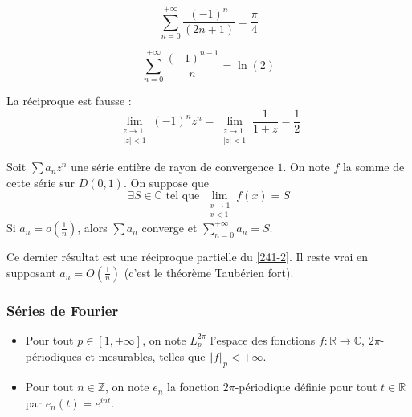 	\begin{application}
		\[ \sum_{n=0}^{+\infty} \frac{(-1)^n}{(2n+1)} = \frac{\pi}{4} \]
	\end{application}
	
	\begin{application}
		\[ \sum_{n=0}^{+\infty} \frac{(-1)^{n-1}}{n} = \ln(2) \]
	\end{application}
	
	\begin{cexample}
		La réciproque est fausse :
		\[ \lim_{\substack{z \rightarrow 1 \\ \vert z \vert < 1}} (-1)^n z^n = \lim_{\substack{z \rightarrow 1 \\ \vert z \vert < 1}} \frac{1}{1+z} = \frac{1}{2} \]
	\end{cexample}
	
	\begin{theorem}
		Soit $\sum a_n z^n$ une série entière de rayon de convergence $1$. On note $f$ la somme de cette série sur $D(0,1)$. On suppose que
		\[ \exists S \in \mathbb{C} \text{ tel que } \lim_{\substack{x \rightarrow 1 \\ x < 1}} f(x) = S \]
		Si $a_n = o \left( \frac{1}{n} \right)$, alors $\sum a_n$ converge et $\sum_{n=0}^{+\infty} a_n = S$.
	\end{theorem}
	
	\begin{remark}
		Ce dernier résultat est une réciproque partielle du \cref{241-2}. Il reste vrai en supposant $a_n = O \left( \frac{1}{n} \right)$ (c'est le théorème Taubérien fort).
	\end{remark}
	
	\subsubsection{Séries de Fourier}
	
	
	\begin{notation}
		\begin{itemize}
			\item Pour tout $p \in [1, +\infty]$, on note $L_p^{2\pi}$ l'espace des fonctions $f : \mathbb{R} \rightarrow \mathbb{C}$, $2\pi$-périodiques et mesurables, telles que $\Vert f \Vert_p < +\infty$.
			\item Pour tout $n \in \mathbb{Z}$, on note $e_n$ la fonction $2\pi$-périodique définie pour tout $t \in \mathbb{R}$ par $e_n(t) = e^{int}$.
		\end{itemize}
	\end{notation}
	
